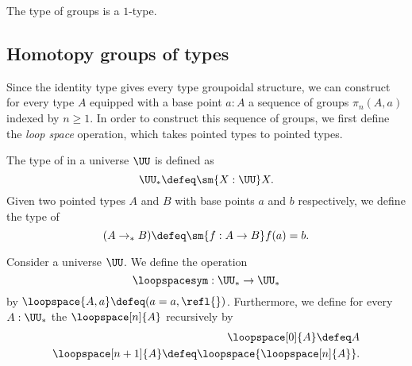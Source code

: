 \begin{cor}
  The type of groups is a $1$-type.
\end{cor}

\subsection{Homotopy groups of types}

Since the identity type gives every type groupoidal structure, we can construct for every type $A$ equipped with a base point $a:A$ a sequence of groups $\pi_n(A,a)$ indexed by $n\geq 1$. In order to construct this sequence of groups, we first define the \emph{loop space} operation, which takes pointed types to pointed types.

\begin{defn}
  The type of  in a universe $\UU$ is defined as
  \begin{equation*}
    \UU_\ast\defeq\sm{X:\UU}X.
  \end{equation*}
  Given two pointed types $A$ and $B$ with base points $a$ and $b$ respectively, we define the type of 
  \begin{equation*}
    (A\to_\ast B)\defeq\sm{f:A\to B}f(a)=b.
  \end{equation*}
\end{defn}

\begin{defn}\label{defn:loop-spaces}
  Consider a universe $\UU$. We define the  operation
  \begin{equation*}
    \loopspacesym : \UU_\ast\to\UU_\ast
  \end{equation*}
  by $\loopspace{A,a}\defeq(a=a,\refl{})$. Furthermore, we define for every $A:\UU_\ast$ the  $\loopspace[n]{A}$ recursively by
  \begin{align*}
    \loopspace[0]{A}\defeq A \\
    \loopspace[n+1]{A}\defeq\loopspace{\loopspace[n]{A}}.
  \end{align*}
\end{defn}


